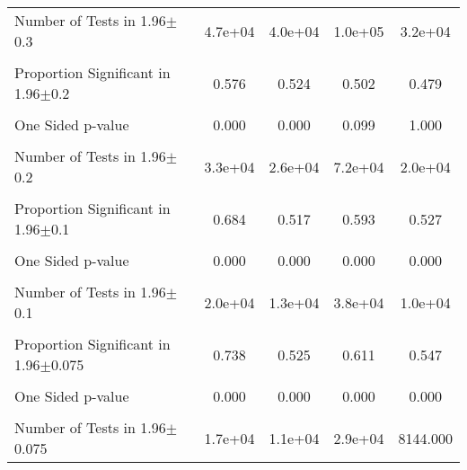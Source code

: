 {\begin{tabular}{l*{4}{c}}
Number of Tests in 1.96$\pm$0.3&  4.7e+04         &  4.0e+04         &  1.0e+05         &  3.2e+04         \\
                &                  &                  &                  &                  \\
\hline Proportion Significant in 1.96$\pm$0.2&    0.576         &    0.524         &    0.502         &    0.479         \\
                &                  &                  &                  &                  \\
One Sided p-value&    0.000         &    0.000         &    0.099         &    1.000         \\
                &                  &                  &                  &                  \\
Number of Tests in 1.96$\pm$0.2&  3.3e+04         &  2.6e+04         &  7.2e+04         &  2.0e+04         \\
                &                  &                  &                  &                  \\
\hline Proportion Significant in 1.96$\pm$0.1&    0.684         &    0.517         &    0.593         &    0.527         \\
                &                  &                  &                  &                  \\
One Sided p-value&    0.000         &    0.000         &    0.000         &    0.000         \\
                &                  &                  &                  &                  \\
Number of Tests in 1.96$\pm$0.1&  2.0e+04         &  1.3e+04         &  3.8e+04         &  1.0e+04         \\
                &                  &                  &                  &                  \\
\hline Proportion Significant in 1.96$\pm$0.075&    0.738         &    0.525         &    0.611         &    0.547         \\
                &                  &                  &                  &                  \\
One Sided p-value&    0.000         &    0.000         &    0.000         &    0.000         \\
                &                  &                  &                  &                  \\
Number of Tests in 1.96$\pm$0.075&  1.7e+04         &  1.1e+04         &  2.9e+04         & 8144.000         \\

\end{tabular}}
